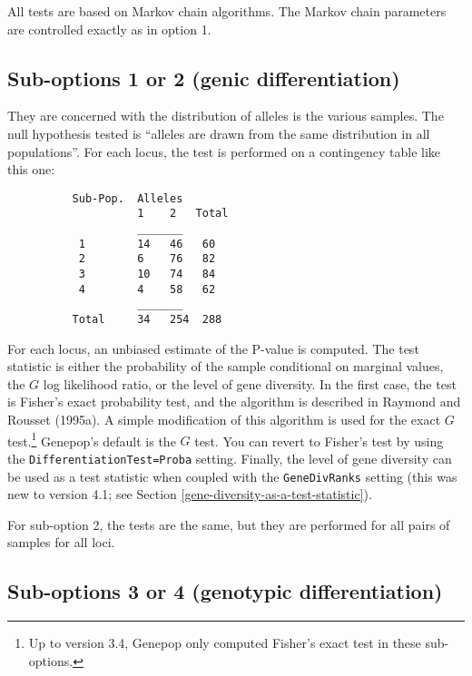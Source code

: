 \documentclass[12pt,]{book}
\let\rmarkdownfootnote\footnote%
\def\footnote{\protect\rmarkdownfootnote}
\theoremstyle{definition}
\theoremstyle{definition}
\theoremstyle{definition}
\theoremstyle{remark}
\begin{document}
All tests are based on Markov chain algorithms. The Markov chain
parameters are controlled exactly as in option 1.

\subsection{Sub-options 1 or 2 (genic
differentiation)}\label{sub-options-1-or-2-genic-differentiation}

 They are concerned with the distribution
of alleles is the various samples. The null hypothesis tested is
``alleles are drawn from the same distribution in all populations''. For
each locus, the test is performed on a contingency table like this one:

\begin{verbatim}
          Sub-Pop.  Alleles
                    1    2   Total
                    _______
           1        14   46   60
           2        6    76   82
           3        10   74   84
           4        4    58   62
                    _______
          Total     34   254  288
\end{verbatim}

For each locus, an unbiased estimate of the P-value is computed. The
test statistic is either the probability of the sample conditional on
marginal values, the \(G\) log likelihood ratio, or the level of gene
diversity. In the first case, the test is Fisher's exact probability
test, and the algorithm is described in Raymond and Rousset (1995a). A
simple modification of this algorithm is used for the exact \(G\)
test.\footnote{Up to version 3.4, Genepop only computed Fisher's exact
  test in these sub-options.} Genepop's default is the \(G\) test. You
can revert to Fisher's test by using the
\texttt{DifferentiationTest=Proba}
setting. Finally, the level of gene diversity can be used as a test
statistic when coupled with the \texttt{GeneDivRanks} setting (this was
new to version 4.1; see Section
\ref{gene-diversity-as-a-test-statistic}).

For sub-option 2, the tests are the same, but they are performed for all
pairs of samples for all loci.

\subsection{Sub-options 3 or 4 (genotypic
differentiation)}\label{sub-options-3-or-4-genotypic-differentiation}
\end{document}
